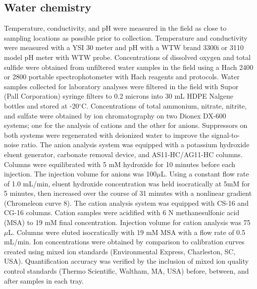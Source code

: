 \subsection{Water chemistry} Temperature, conductivity, and pH were measured in the field as close to sampling locations as possible prior to collection. Temperature and conductivity were measured with a YSI 30 meter and pH with a WTW brand 3300i or 3110 model pH meter with WTW probe. Concentrations of dissolved oxygen and total sulfide were obtained from unfiltered water samples in the field using a Hach 2400 or 2800 portable spectrophotometer with Hach reagents and protocols. Water samples collected for laboratory analyses were filtered in the field with Supor (Pall Corporation) syringe filters to 0.2 microns into 30 mL HDPE Nalgene bottles and stored at -20$^{\circ}$C. Concentrations of total ammonium, nitrate, nitrite, and sulfate were obtained by ion chromatography on two Dionex DX-600 systems; one for the analysis of cations and the other for anions. Suppressors on both systems were regenerated with deionized water to improve the signal-to-noise ratio. The anion analysis system was equipped with a potassium hydroxide eluent generator, carbonate removal device, and AS11-HC/AG11-HC columns. Columns were equilibrated with 5 mM hydroxide for 10 minutes before each injection. The injection volume for anions was 100$\mu$L. Using a constant flow rate of 1.0 mL/min, eluent hydroxide concentration was held isocratically at 5mM for 5 minutes, then increased over the course of 31 minutes with a nonlinear gradient (Chromeleon curve 8). The cation analysis system was equipped with CS-16 and CG-16 columns. Cation samples were acidified with 6 N methanesulfonic acid (MSA) to 19 mM final concentration. Injection volume for cation analysis was 75$\mu$L. Columns were eluted isocratically with 19 mM MSA with a flow rate of 0.5 mL/min. Ion concentrations were obtained by comparison to calibration curves created using mixed ion standards (Environmental Express, Charleston, SC, USA). Quantification accuracy was verified by the inclusion of mixed ion quality control standards (Thermo Scientific, Waltham, MA, USA) before, between, and after samples in each tray.

